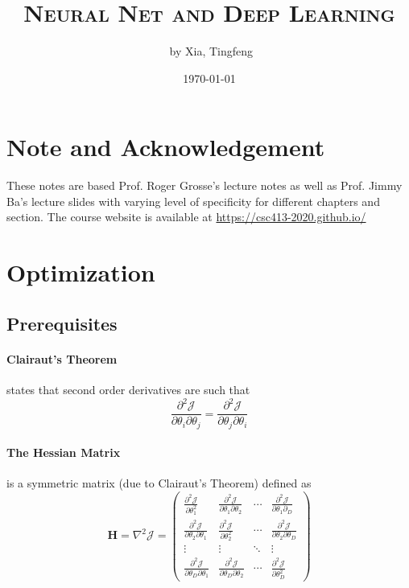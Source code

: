 \documentclass[11pt]{article}
\author{\ccLogo \,\,by Xia, Tingfeng}
\title{\textsc{Neural Net and Deep Learning}}
\date{\today}
\begin{document}
\maketitle
\doclicenseThis

\section*{Note and Acknowledgement}
These notes are based Prof. Roger Grosse's lecture notes as well as Prof. Jimmy Ba's lecture slides with varying level of specificity for different chapters and section. The course website is available at \url{https://csc413-2020.github.io/}

\tableofcontents
\newpage


\section{Optimization}
\subsection{Prerequisites}

\paragraph{Clairaut's Theorem} states that second order derivatives are such that
\begin{equation}
    \frac{\partial^{2} \mathcal{J}}{\partial \theta_{i} \partial \theta_{j}}=\frac{\partial^{2} \mathcal{J}}{\partial \theta_{j} \partial \theta_{i}}
\end{equation}

\paragraph{The Hessian Matrix} is a symmetric matrix (due to Clairaut's Theorem) defined as
\begin{equation}
    \mathbf{H}=\nabla^{2} \mathcal{J}=\left(\begin{array}{cccc}
{\frac{\partial^{2} \mathcal{J}}{\partial \theta_{1}^{2}}} & {\frac{\partial^{2} \mathcal{J}}{\partial \theta_{1} \partial \theta_{2}}} & {\cdots} & {\frac{\partial^{2} \mathcal{J}}{\partial \theta_{1} \partial_{D}}} \\
{\frac{\partial^{2} \mathcal{J}}{\partial \theta_{2} \partial \theta_{1}}} & {\frac{\partial^{2} \mathcal{J}}{\partial \theta_{2}^{2}}} & {\cdots} & {\frac{\partial^{2} \mathcal{J}}{\partial \theta_{2} \partial \theta_{D}}} \\
{\vdots} & {\vdots} & {\ddots} & {\vdots} \\
{\frac{\partial^{2} \mathcal{J}}{\partial \theta_{D} \partial \theta_{1}}} & {\frac{\partial^{2} \mathcal{J}}{\partial \theta_{D} \partial \theta_{2}}} & {\cdots} & {\frac{\partial^{2} \mathcal{J}}{\partial \theta_{D}^{2}}}
\end{array}\right)
\end{equation}
\end{document}
